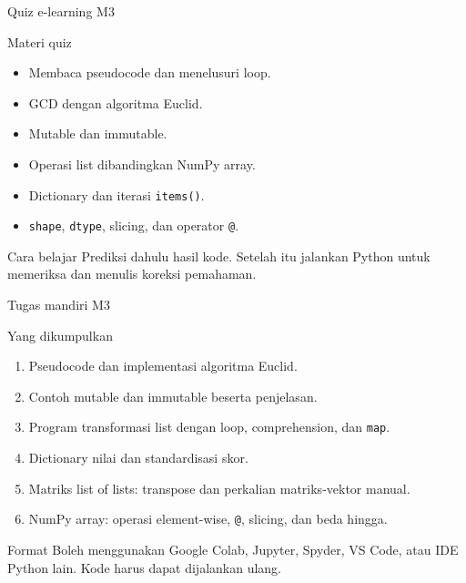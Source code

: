 \documentclass[aspectratio=169,11pt]{beamer}
\begin{document}
\begin{frame}{Quiz e-learning M3}
\begin{block}{Materi quiz}
\begin{itemize}
  \item Membaca pseudocode dan menelusuri loop.
  \item GCD dengan algoritma Euclid.
  \item Mutable dan immutable.
  \item Operasi list dibandingkan NumPy array.
  \item Dictionary dan iterasi \texttt{items()}.
  \item \texttt{shape}, \texttt{dtype}, slicing, dan operator \texttt{@}.
\end{itemize}
\end{block}
\begin{block}{Cara belajar}
Prediksi dahulu hasil kode. Setelah itu jalankan Python untuk memeriksa dan menulis koreksi pemahaman.
\end{block}
\end{frame}

\begin{frame}{Tugas mandiri M3}
\begin{block}{Yang dikumpulkan}
\begin{enumerate}\small
  \item Pseudocode dan implementasi algoritma Euclid.
  \item Contoh mutable dan immutable beserta penjelasan.
  \item Program transformasi list dengan loop, comprehension, dan \texttt{map}.
  \item Dictionary nilai dan standardisasi skor.
  \item Matriks list of lists: transpose dan perkalian matriks-vektor manual.
  \item NumPy array: operasi element-wise, \texttt{@}, slicing, dan beda hingga.
\end{enumerate}
\end{block}
\begin{block}{Format}
Boleh menggunakan Google Colab, Jupyter, Spyder, VS Code, atau IDE Python lain. Kode harus dapat dijalankan ulang.
\end{block}
\end{frame}
\end{document}
